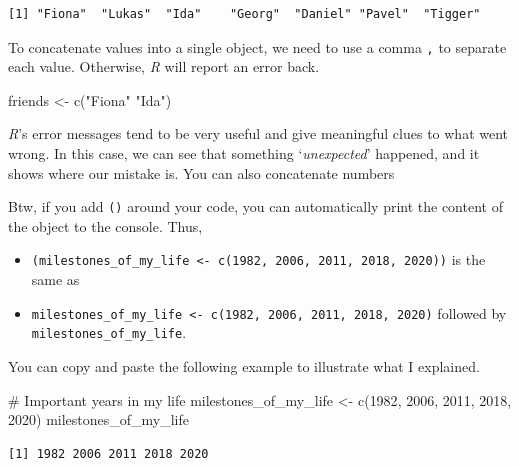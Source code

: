 \documentclass[
  letterpaper,
]{krantz}
\makeatletter
\newenvironment{Shaded}{\begin{snugshade}}{\end{snugshade}}
\newcommand{\CommentTok}[1]{\textcolor[rgb]{0.37,0.37,0.37}{#1}}
\newcommand{\DecValTok}[1]{\textcolor[rgb]{0.68,0.00,0.00}{#1}}
\newcommand{\FunctionTok}[1]{\textcolor[rgb]{0.28,0.35,0.67}{#1}}
\newcommand{\NormalTok}[1]{\textcolor[rgb]{0.00,0.23,0.31}{#1}}
\newcommand{\OtherTok}[1]{\textcolor[rgb]{0.00,0.23,0.31}{#1}}
\newcommand{\StringTok}[1]{\textcolor[rgb]{0.13,0.47,0.30}{#1}}
\newenvironment{kframe}{%
\medskip{}
\setlength{\fboxsep}{.8em}
 \def\at@end@of@kframe{}%
 \ifinner\ifhmode%
  \def\at@end@of@kframe{\end{minipage}}%
  \begin{minipage}{\columnwidth}%
 \fi\fi%
 \def\FrameCommand##1{\hskip\@totalleftmargin \hskip-\fboxsep
 \colorbox{shadecolor}{##1}\hskip-\fboxsep
     \hskip-\linewidth \hskip-\@totalleftmargin \hskip\columnwidth}%
 \MakeFramed {\advance\hsize-\width
   \@totalleftmargin\z@ \linewidth\hsize
   \@setminipage}}%
 {\par\unskip\endMakeFramed%
 \at@end@of@kframe}
\renewenvironment{Shaded}{\begin{kframe}}{\end{kframe}}
\makeatother
\begin{document}
\begin{verbatim}
[1] "Fiona"  "Lukas"  "Ida"    "Georg"  "Daniel" "Pavel"  "Tigger"
\end{verbatim}

To concatenate values into a single object, we need to use a comma
\texttt{,} to separate each value. Otherwise, \emph{R} will report an
error back.

\begin{Shaded}
\begin{Highlighting}[]
\NormalTok{friends }\OtherTok{\textless{}{-}} \FunctionTok{c}\NormalTok{(}\StringTok{"Fiona"} \StringTok{"Ida"}\NormalTok{)}
\end{Highlighting}
\end{Shaded}

\emph{R}'s error messages tend to be very useful and give meaningful
clues to what went wrong. In this case, we can see that something
`\emph{unexpected}' happened, and it shows where our mistake is. You can
also concatenate numbers

Btw, if you add \texttt{()} around your code, you can automatically
print the content of the object to the console. Thus,

\begin{itemize}
\item
  \texttt{(milestones\_of\_my\_life\ \textless{}-\ c(1982,\ 2006,\ 2011,\ 2018,\ 2020))}
  is the same as
\item
  \texttt{milestones\_of\_my\_life\ \textless{}-\ c(1982,\ 2006,\ 2011,\ 2018,\ 2020)}
  followed by \texttt{milestones\_of\_my\_life}.
\end{itemize}

You can copy and paste the following example to illustrate what I
explained.

\begin{Shaded}
\begin{Highlighting}[]
\CommentTok{\# Important years in my life}
\NormalTok{milestones\_of\_my\_life }\OtherTok{\textless{}{-}} \FunctionTok{c}\NormalTok{(}\DecValTok{1982}\NormalTok{, }\DecValTok{2006}\NormalTok{, }\DecValTok{2011}\NormalTok{, }\DecValTok{2018}\NormalTok{, }\DecValTok{2020}\NormalTok{)}
\NormalTok{milestones\_of\_my\_life}
\end{Highlighting}
\end{Shaded}

\begin{verbatim}
[1] 1982 2006 2011 2018 2020
\end{verbatim}
\end{document}
